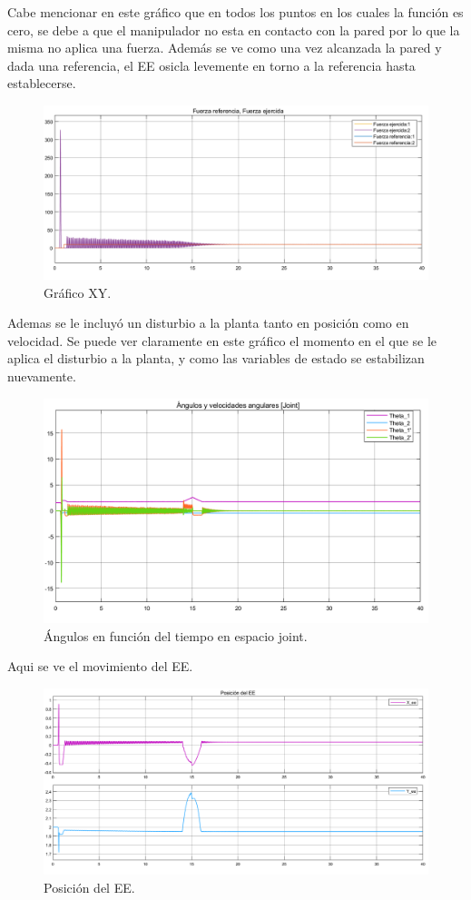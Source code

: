 Cabe mencionar en este gráfico que en todos los puntos en los cuales la función es cero, se debe a que el manipulador no esta en contacto con la pared por lo que la misma no aplica una fuerza.
Además se ve como una vez alcanzada la pared y dada una referencia, el EE osicla levemente en torno a la referencia hasta establecerse.
\begin{figure}[H]
	\centering
	\includegraphics[width=0.8\linewidth]{ImagenesControl de fuerza no lineal/2_3_e}
	\caption{Gr\'afico XY.}	
	\label{fig:af}
\end{figure}
Ademas se le incluy\'o un disturbio a la planta tanto en posici\'on como en velocidad.
Se puede ver claramente en este gráfico el momento en el que se le aplica el disturbio a la planta, y como las variables de estado se estabilizan nuevamente.
\begin{figure}[H]
	\centering
	\includegraphics[width=0.8\linewidth]{ImagenesControl de fuerza no lineal/2_3_f_a}
	\caption{\'Angulos en funci\'on del tiempo en espacio joint.}	
	\label{fig:athetasd}
\end{figure}
Aqui se ve el movimiento del EE.
\begin{figure}[H]
	\centering
	\includegraphics[width=0.8\linewidth]{ImagenesControl de fuerza no lineal/2_3_f_b}
	\caption{Posici\'on del EE.}	
	\label{fig:aposd}
\end{figure}
